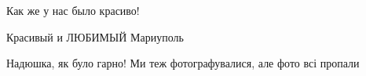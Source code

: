  
 
 
 
 

\qqSecCmt


Как же у нас было красиво!


Красивый и ЛЮБИМЫЙ Мариуполь🌷😍


Надюшка, як було гарно! Ми теж фотографувалися, але фото всі пропали
